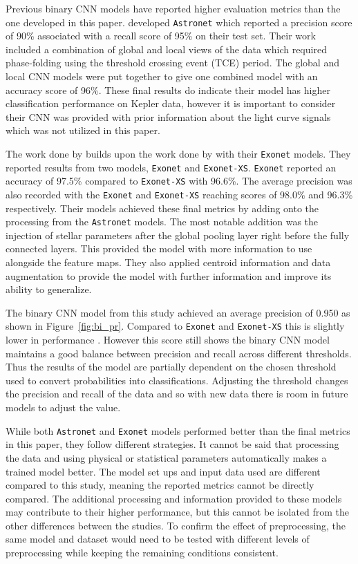 Previous binary CNN models have reported higher evaluation metrics than the one developed in this paper. \citet{2018AJ....155...94S} developed \texttt{Astronet} which reported a precision score of 90\% associated with a recall score of 95\% on their test set. Their work included a combination of global and local views of the data which required phase-folding using the threshold crossing event (TCE) period. The global and local CNN models were put together to give one combined model with an accuracy score of 96\%. These final results do indicate their model has higher classification performance on Kepler data, however it is important to consider their CNN was provided with prior information about the light curve signals which was not utilized in this paper. 

The work done by \citet{Ansdell_2018} builds upon the work done by \citet{2018AJ....155...94S} with their \texttt{Exonet} models. They reported results from two models, \texttt{Exonet} and \texttt{Exonet-XS}. \texttt{Exonet} reported an accuracy of 97.5\% compared to \texttt{Exonet-XS} with 96.6\%. The average precision was also recorded with the \texttt{Exonet} and \texttt{Exonet-XS} reaching scores of 98.0\% and 96.3\% respectively. Their models achieved these final metrics by adding onto the processing from the \texttt{Astronet} models. The most notable addition was the injection of stellar parameters after the global pooling layer right before the fully connected layers. This provided the model with more information to use alongside the feature maps. They also applied centroid information and data augmentation to provide the model with further information and improve its ability to generalize.

The binary CNN model from this study achieved an average precision of 0.950 as shown in Figure~\ref{fig:bi_pr}. Compared to \texttt{Exonet} and \texttt{Exonet-XS} this is slightly lower in performance \citep{Ansdell_2018}. However this score still shows the binary CNN model maintains a good balance between precision and recall across different thresholds. Thus the results of the model are partially dependent on the chosen threshold used to convert probabilities into classifications. Adjusting the threshold changes the precision and recall of the data and so with new data there is room in future models to adjust the value.

While both \texttt{Astronet} and \texttt{Exonet} models performed better than the final metrics in this paper, they follow different strategies. It cannot be said that processing the data and using physical or statistical parameters automatically makes a trained model better. The model set ups and input data used are different compared to this study, meaning the reported metrics cannot be directly compared. The additional processing and information provided to these models may contribute to their higher performance, but this cannot be isolated from the other differences between the studies. To confirm the effect of preprocessing, the same model and dataset would need to be tested with different levels of preprocessing while keeping the remaining conditions consistent.

